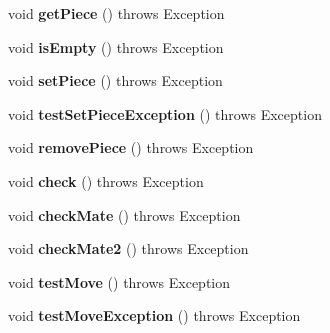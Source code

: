 \begin{DoxyCompactItemize}
\item 
\hypertarget{classBoard_1_1BoardTest_a418fc471dc9448638e352312f07ecac9}{void {\bfseries get\-Piece} ()  throws Exception }\label{classBoard_1_1BoardTest_a418fc471dc9448638e352312f07ecac9}

\item 
\hypertarget{classBoard_1_1BoardTest_ad20a5c811d5a040361413b00ab1086f0}{void {\bfseries is\-Empty} ()  throws Exception }\label{classBoard_1_1BoardTest_ad20a5c811d5a040361413b00ab1086f0}

\item 
\hypertarget{classBoard_1_1BoardTest_a812e290f6bb95a4d950ed5445d556f40}{void {\bfseries set\-Piece} ()  throws Exception }\label{classBoard_1_1BoardTest_a812e290f6bb95a4d950ed5445d556f40}

\item 
\hypertarget{classBoard_1_1BoardTest_a672fcbc8e906eaa083cd9c584bb08adf}{void {\bfseries test\-Set\-Piece\-Exception} ()  throws Exception }\label{classBoard_1_1BoardTest_a672fcbc8e906eaa083cd9c584bb08adf}

\item 
\hypertarget{classBoard_1_1BoardTest_af9c5bad34b8cfa72a4131ca92c06875b}{void {\bfseries remove\-Piece} ()  throws Exception }\label{classBoard_1_1BoardTest_af9c5bad34b8cfa72a4131ca92c06875b}

\item 
\hypertarget{classBoard_1_1BoardTest_a653f31e72b3b5aa6d775f3b7234a8207}{void {\bfseries check} ()  throws Exception }\label{classBoard_1_1BoardTest_a653f31e72b3b5aa6d775f3b7234a8207}

\item 
\hypertarget{classBoard_1_1BoardTest_ace6072d8d0e7144454113e62b9ba6703}{void {\bfseries check\-Mate} ()  throws Exception }\label{classBoard_1_1BoardTest_ace6072d8d0e7144454113e62b9ba6703}

\item 
\hypertarget{classBoard_1_1BoardTest_a6cca33a12e7caf99a18cd4f3846037c9}{void {\bfseries check\-Mate2} ()  throws Exception }\label{classBoard_1_1BoardTest_a6cca33a12e7caf99a18cd4f3846037c9}

\item 
\hypertarget{classBoard_1_1BoardTest_a4e1243b5604936e1c651f851850644fd}{void {\bfseries test\-Move} ()  throws Exception }\label{classBoard_1_1BoardTest_a4e1243b5604936e1c651f851850644fd}

\item 
\hypertarget{classBoard_1_1BoardTest_ad323c55fdd4ced38a9feb3c33905022c}{void {\bfseries test\-Move\-Exception} ()  throws Exception }\label{classBoard_1_1BoardTest_ad323c55fdd4ced38a9feb3c33905022c}


\end{DoxyCompactItemize}
